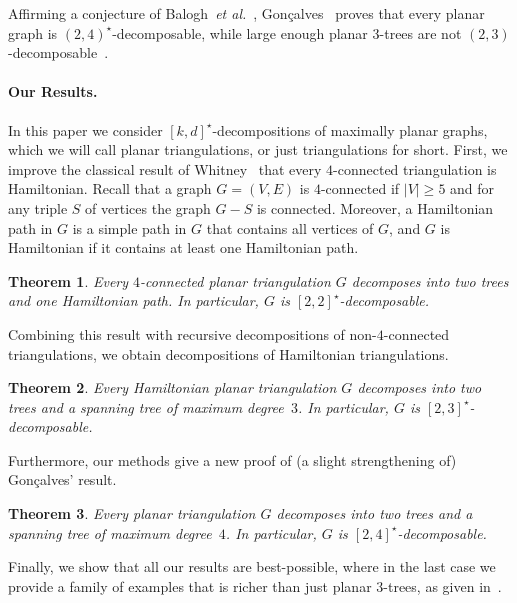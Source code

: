 \documentclass[a4paper,10pt]{article}
\theoremstyle{plain}
\newtheorem{thm}{Theorem}[section]
\begin{document}
Affirming a conjecture of Balogh~\textit{et al.}~\cite{Bal-05}, Gon{\c{c}}alves~\cite{Gon-09} proves that every planar graph is $(2,4)^\star$-decomposable, while large enough planar $3$-trees are not $(2,3)$-decomposable~\cite{Bal-05}.


\paragraph{Our Results.}

In this paper we consider $[k,d]^\star$-decompositions of maximally planar graphs, which we will call planar triangulations, or just triangulations for short.
First, we improve the classical result of Whitney~\cite{Whi-32} that every $4$-connected triangulation is Hamiltonian.
Recall that a graph $G = (V,E)$ is $4$-connected if $|V| \geq 5$ and for any triple $S$ of vertices the graph $G - S$ is connected.
Moreover, a Hamiltonian path in $G$ is a simple path in $G$ that contains all vertices of $G$, and $G$ is Hamiltonian if it contains at least one Hamiltonian path.

\begin{thm}\label{thm:2t1p}
 Every $4$-connected planar triangulation $G$ decomposes into two trees and one Hamiltonian path. In particular, $G$ is $[2,2]^\star$-decomposable.
\end{thm}

Combining this result with recursive decompositions of non-$4$-connected triangulations, we obtain decompositions of Hamiltonian triangulations.

\begin{thm}\label{thm:hamil}
 Every Hamiltonian planar triangulation $G$ decomposes into two trees and a spanning tree of maximum degree~$3$. In particular, $G$ is $[2,3]^\star$-decomposable.
\end{thm}

Furthermore, our methods give a new proof of (a slight strengthening of) Gon\c{c}alves' result.

\begin{thm}\label{thm:planar}
 Every planar triangulation $G$ decomposes into two trees and a spanning tree of maximum degree~$4$. In particular, $G$ is $[2,4]^\star$-decomposable.
\end{thm}

Finally, we show that all our results are best-possible, where in the last case we provide a family of examples that is richer than just planar $3$-trees, as given in~\cite{Bal-05}.
\end{document}
